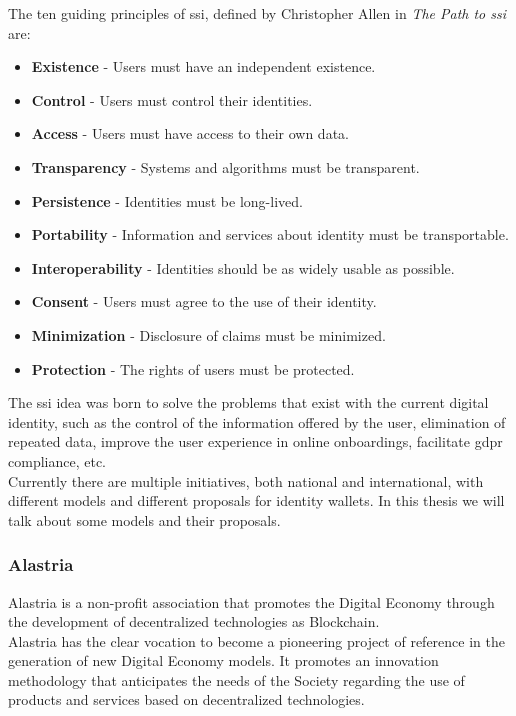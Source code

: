 The ten guiding principles of \acrshort{ssi}, defined by Christopher Allen in \textit{The Path to \acrlong{ssi}}\cite{path-to-ssi} are:\\
\begin{itemize}
    \item \textbf{Existence} - Users must have an independent existence.
    \item \textbf{Control} - Users must control their identities.
    \item \textbf{Access} - Users must have access to their own data.
    \item \textbf{Transparency} - Systems and algorithms must be transparent.
    \item \textbf{Persistence} - Identities must be long-lived.
    \item \textbf{Portability} - Information and services about identity must be transportable.
    \item \textbf{Interoperability} - Identities should be as widely usable as possible.
    \item \textbf{Consent} - Users must agree to the use of their identity.
    \item \textbf{Minimization} - Disclosure of claims must be minimized.
    \item \textbf{Protection} - The rights of users must be protected.
\end{itemize}

The \acrshort{ssi} idea was born to solve the problems that exist with the current digital identity, such as the control of the information offered by the user, elimination of repeated data, improve the user experience in online onboardings, facilitate \acrshort{gdpr} compliance, etc.\\

Currently there are multiple initiatives, both national and international, with different models and different proposals for identity wallets. In this thesis we will talk about some models and their proposals.

\subsubsection{Alastria}
Alastria is a non-profit association that promotes the Digital Economy through the development of decentralized technologies as Blockchain.\\

Alastria has the clear vocation to become a pioneering project of reference in the generation of new Digital Economy models. It promotes an innovation methodology that anticipates the needs of the Society regarding the use of products and services based on decentralized technologies.\\


